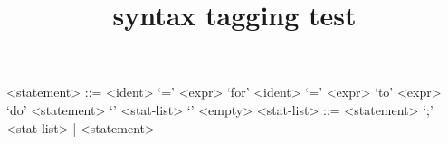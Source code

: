 \documentclass{article}
\title{syntax tagging test}
\begin{document}
\begin{grammar}
<statement> ::= <ident> `=' <expr>
\alt `for' <ident> `=' <expr> `to' <expr> `do' <statement>
\alt `{' <stat-list> `}'
\alt <empty>
<stat-list> ::= <statement> `;' <stat-list> | <statement>
\end{grammar}
\end{document}
